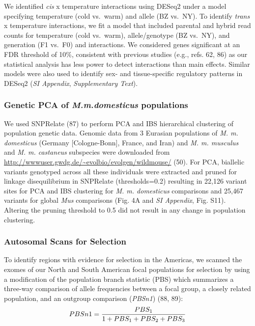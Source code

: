 \documentclass[9pt,twocolumn,twoside,lineno]{pnas-new}
\begin{document}
We identified \emph{cis} x temperature interactions using DESeq2 under a
model specifying temperature (cold vs.~warm) and allele (BZ vs.~NY). To
identify \emph{trans} x temperature interactions, we fit a model that
included parental and hybrid read counts for temperature (cold
vs.~warm), allele/genotype (BZ vs.~NY), and generation (F1 vs.~F0) and
interactions. We considered genes significant at an FDR threshold of
10\%, consistent with previous studies (e.g., refs. 62, 86) as our
statistical analysis has less power to detect interactions than main
effects. Similar models were also used to identify sex- and
tissue-specific regulatory patterns in DESeq2 (\emph{SI Appendix},
\emph{Supplementary Text}).

\hypertarget{genetic-PCA-of-M.m-domesticus-populations}{%
\subsubsection*{\texorpdfstring{Genetic PCA of \emph{M.m.domesticus}
populations}{Genetic PCA of M.m.domesticus populations}}\label{genetic-PCA-of-M.m-domesticus-populations}}

We used SNPRelate (87) to perform PCA and IBS hierarchical clustering of
population genetic data. Genomic data from 3 Eurasian populations of
\emph{M. m. domesticus} (Germany {[}Cologne-Bonn{]}, France, and Iran)
and \emph{M. m. musculus} and \emph{M. m. castaneus} subspecies were
downloaded from \url{http://wwwuser.gwdg.de/~evolbio/evolgen/wildmouse/}
(50). For PCA, biallelic variants genotyped across all these individuals
were extracted and pruned for linkage disequilibrium in SNPRelate
(thresholds=0.2) resulting in 22,126 variant sites for PCA and IBS
clustering for \emph{M. m. domesticus} comparisons and 25,467 variants
for global \emph{Mus} comparisons (Fig. 4A and \emph{SI Appendix}, Fig.
S11). Altering the pruning threshold to 0.5 did not result in any change
in population clustering.

\hypertarget{autosomal-scans-for-selection}{%
\subsubsection*{Autosomal Scans for
Selection}\label{autosomal-scans-for-selection}}

To identify regions with evidence for selection in the Americas, we
scanned the exomes of our North and South American focal populations for
selection by using a modification of the population branch statistic
(PBS) which summarizes a three-way comparison of allele frequencies
between a focal group, a closely related population, and an outgroup
comparison (\emph{PBSn1}) (88, 89):
\[ PBSn1 = {PBS_1 \over 1 + PBS_1 + PBS_2 + PBS_3}  \]
\end{document}
